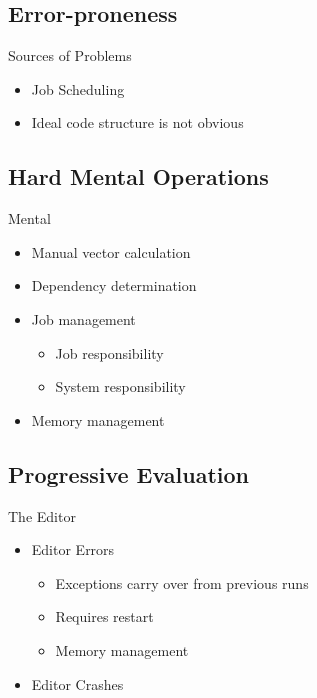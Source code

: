 \subsection{Error-proneness}
\begin{frame}{\secname}{\subsecname}
	Sources of Problems
	\begin{itemize}
		\item<2-> Job Scheduling
		\item<3-> Ideal code structure is not obvious
	\end{itemize}
\end{frame}

\subsection{Hard Mental Operations}
\begin{frame}{\secname}{\subsecname}
	Mental 
	\begin{itemize}
		\item<2-> Manual vector calculation
		\item<3-> Dependency determination
		\item<4-> Job management
		\begin{itemize}
			\item<5-> Job responsibility
			\item<6-> System responsibility
		\end{itemize}
		\item<7-> Memory management
	\end{itemize}
\end{frame}

\subsection{Progressive Evaluation}
\begin{frame}{\secname}{\subsecname}
	The Editor
	\begin{itemize}
		\item<2-> Editor Errors
		\begin{itemize}
			\item<3-> Exceptions carry over from previous runs
			\item<4-> Requires restart
			\item<5-> Memory management
		\end{itemize}
		\item<6-> Editor Crashes
	\end{itemize}
\end{frame}

